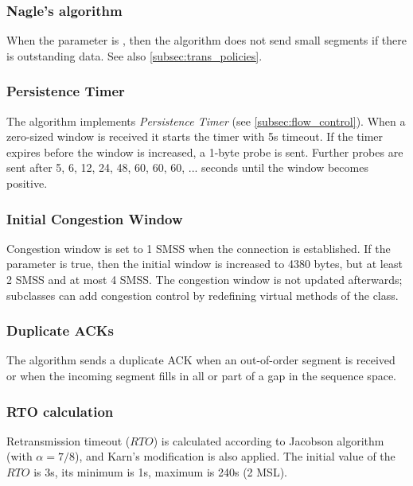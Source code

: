 \subsubsection*{Nagle's algorithm}

When the  parameter is , then
the algorithm does not send small segments if there is outstanding
data. See also \ref{subsec:trans_policies}.

\subsubsection*{Persistence Timer}

The algorithm implements \emph{Persistence Timer} (see \ref{subsec:flow_control}).
When a zero-sized window is received it starts the timer with 5s timeout.
If the timer expires before the window is increased, a 1-byte probe is
sent. Further probes are sent after 5, 6, 12, 24, 48, 60, 60, 60, ...
seconds until the window becomes positive.

\subsubsection*{Initial Congestion Window} 

Congestion window is set to 1 SMSS when the connection is established.
If the  parameter is true, then the initial
window is increased to 4380 bytes, but at least 2 SMSS and at most 4 SMSS.
The congestion window is not updated afterwards; subclasses can
add congestion control by redefining virtual methods of the
 class.

\subsubsection*{Duplicate ACKs}

The algorithm sends a duplicate ACK when an out-of-order
segment is received or when the incoming segment fills in all
or part of a gap in the sequence space.

\subsubsection*{RTO calculation}

Retransmission timeout ($RTO$) is calculated according to
Jacobson algorithm (with $\alpha=7/8$), and Karn's modification is also applied.
The initial value of the $RTO$ is 3s, its minimum is 1s,
maximum is 240s (2 MSL).

